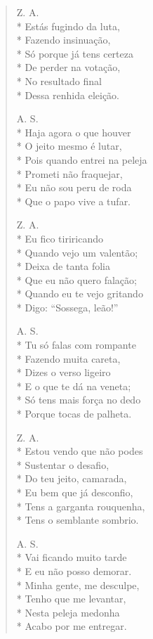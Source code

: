 \begin{verse}
Z. A.\\*
Estás fugindo da luta,\\*
Fazendo insinuação,\\*
Só porque já tens certeza\\*
De perder na votação,\\*
No resultado final\\*
Dessa renhida eleição.

A. S.\\*
Haja agora o que houver\\*
O jeito mesmo é lutar,\\*
Pois quando entrei na peleja\\*
Prometi não fraquejar,\\*
Eu não sou peru de roda\\*
Que o papo vive a tufar.

Z. A.\\*
Eu fico tiriricando\\*
Quando vejo um valentão;\\*
Deixa de tanta folia\\*
Que eu não quero falação;\\*
Quando eu te vejo gritando\\*
Digo: “Sossega, leão!”

A. S.\\*
Tu só falas com rompante\\*
Fazendo muita careta,\\*
Dizes o verso ligeiro\\*
E o que te dá na veneta;\\*
Só tens mais força no dedo\\*
Porque tocas de palheta.

Z. A.\\*
Estou vendo que não podes\\*
Sustentar o desafio,\\*
Do teu jeito, camarada,\\*
Eu bem que já desconfio,\\*
Tens a garganta rouquenha,\\*
Tens o semblante sombrio.

A. S.\\*
Vai ficando muito tarde\\*
E eu não posso demorar.\\*
Minha gente, me desculpe,\\*
Tenho que me levantar,\\*
Nesta peleja medonha\\*
Acabo por me entregar.


\end{verse}
